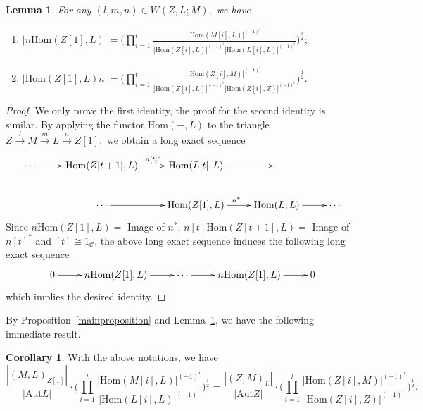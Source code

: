 \documentclass{amsart}
\newtheorem{lemma}[theorem]{Lemma}
\theoremstyle{definition}
\newtheorem{Cor}[theorem]{Corollary}
\numberwithin{equation}{section}
\begin{document}
\begin{lemma}\label{stablespace}
For any $(l,m,n)\in W(Z, L; M),$ we have
\begin{enumerate}
  \item $|n{\mathrm{Hom}}(Z[1], L)|=\big(\displaystyle\prod_{i=1}^t\displaystyle\frac{|{\mathrm{Hom}}(M[i], L)|^{(-1)^i}}
  {|{\mathrm{Hom}}(Z[i], L)|^{(-1)^i}|{\mathrm{Hom}}(L[i], L)|^{(-1)^i}}\big)^{\frac{1}{2}};$
  \item $|{\mathrm{Hom}}(Z[1], L)n|=\big(\displaystyle\prod_{i=1}^t\displaystyle\frac{|{\mathrm{Hom}}(Z[i], M)|^{(-1)^i}}
  {|{\mathrm{Hom}}(Z[i], L)|^{(-1)^i}|{\mathrm{Hom}}(Z[i], Z)|^{(-1)^i}}\big)^{\frac{1}{2}}.$
\end{enumerate}
\end{lemma}
\begin{proof}
We only prove the first identity, the proof for the second identity
is similar. By applying the functor ${\mathrm{Hom}}(-, L)$ to the triangle
$Z\xrightarrow{l}M\xrightarrow{m}L\xrightarrow{n}Z[1],$ we obtain a
long exact sequence
$$
\xymatrix{\cdots \ar[r]&{\mathrm{Hom}}(Z[t+1], L) \ar[r]^-{n[t]^*}&{\mathrm{Hom}}(L[t],
L)\ar[r]&&
\\
&\cdots\ar[r]&{\mathrm{Hom}}(Z[1], L)\ar[r]^{n^*}&{\mathrm{Hom}}(L, L)\ar[r]&\cdots}
$$
Since $n{\mathrm{Hom}} (Z[1], L)=$ Image of $n^*$, $n[t]{\mathrm{Hom}}(Z[t+1], L)=$
Image of $n[t]^*$ and $[t] \cong 1_{{\mathcal{C}}}$, the above long exact
sequence induces the following long exact sequence
$$
\xymatrix{0\ar[r]&n{\mathrm{Hom}}(Z[1], L)\ar[r]&\cdots\ar[r]&n{\mathrm{Hom}}(Z[1],
L)\ar[r]&0}
$$
which implies the desired identity.

\end{proof}

By Proposition~\ref{mainproposition} and Lemma~\ref{stablespace}, we
have the following immediate result.
\begin{Cor}\label{symmetry}
With the above notations, we have
$$\frac{|(M,L)_{Z[1]}|}{|\mathrm{Aut}L|}\cdot
\big(\prod_{i=1}^t\frac{|{\mathrm{Hom}}(M[i], L)|^{(-1)^i}}{|{\mathrm{Hom}}(L[i],
L)|^{(-1)^i}}\big)^{\frac{1}{2}}=\frac{|(Z,M)_{L}|}{|\mathrm{Aut}Z|}\cdot
\big(\prod_{i=1}^t\frac{|{\mathrm{Hom}}(Z[i], M)|^{(-1)^i}}{|{\mathrm{Hom}}(Z[i],
Z)|^{(-1)^i}}\big)^{\frac{1}{2}}.$$
\end{Cor}
\end{document}
